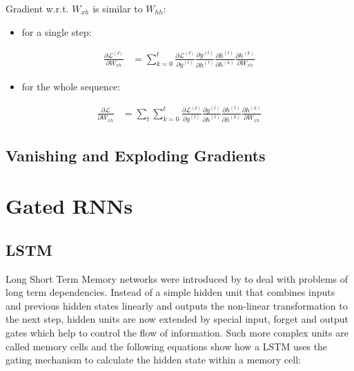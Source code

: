 \documentclass[]{krantz}
\providecommand{\tightlist}{%
  \setlength{\itemsep}{0pt}\setlength{\parskip}{0pt}}
\begin{document}
Gradient w.r.t. \(W_{xh}\) is similar to \(W_{hh}\):

\begin{itemize}
\tightlist
\item
  for a single step:
\end{itemize}

\begin{align}
\frac{\partial \mathcal{L^{(t)}}}{\partial W_{xh}}
& = \sum_{k=0}^{t} \frac{\partial \mathcal{L^{(t)}}}{\partial y^{(t)}} \frac{\partial y^{(t)}}{\partial h^{(t)}} \frac{\partial h^{(t)}}{\partial h^{(k)}} \frac{\partial h^{(k)}}{\partial W_{xh}} \label{eq:rnn-back-xh-one}
\end{align}

\begin{itemize}
\tightlist
\item
  for the whole sequence:
\end{itemize}

\begin{align}
\frac{\partial \mathcal{L}}{\partial W_{xh}}
& = \sum_{t} \sum_{k=0}^{t} \frac{\partial \mathcal{L^{(t)}}}{\partial y^{(t)}} \frac{\partial y^{(t)}}{\partial h^{(t)}} \frac{\partial h^{(t)}}{\partial h^{(k)}} \frac{\partial h^{(k)}}{\partial W_{xh}} \label{eq:rnn-back-xh-all}
\end{align}

\citep{chen2016gentle}

\hypertarget{vanishing-and-exploding-gradients}{%
\subsection{Vanishing and Exploding Gradients}\label{vanishing-and-exploding-gradients}}

\hypertarget{gated-rnns}{%
\section{Gated RNNs}\label{gated-rnns}}

\hypertarget{lstm}{%
\subsection{LSTM}\label{lstm}}

Long Short Term Memory networks were introduced by \citet{hochreiter1997long} to deal with problems of long term dependencies. Instead of a simple hidden unit that combines inputs and previous hidden states linearly and outputs the non-linear transformation to the next step, hidden units are now extended by special input, forget and output gates which help to control the flow of information. Such more complex units are called memory cells and the following equations show how a LSTM uses the gating mechanism to calculate the hidden state within a memory cell:
\end{document}

